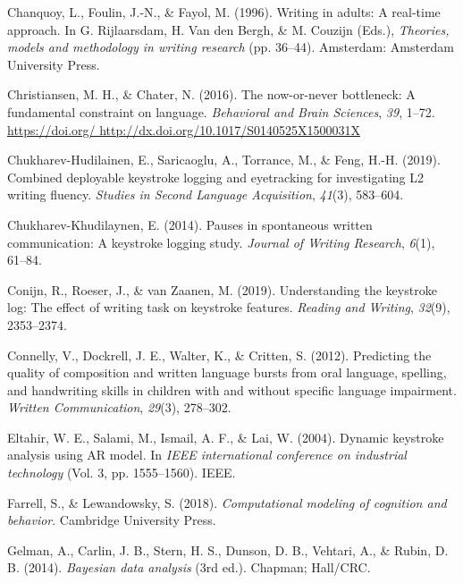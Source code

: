 \documentclass[english,man,floatsintext]{apa7}
\begin{document}
\leavevmode\hypertarget{ref-chanquoy1996writing}{}%
Chanquoy, L., Foulin, J.-N., \& Fayol, M. (1996). Writing in adults: A real-time approach. In G. Rijlaarsdam, H. Van den Bergh, \& M. Couzijn (Eds.), \emph{Theories, models and methodology in writing research} (pp. 36--44). Amsterdam: Amsterdam University Press.

\leavevmode\hypertarget{ref-christiansen2016now}{}%
Christiansen, M. H., \& Chater, N. (2016). The now-or-never bottleneck: A fundamental constraint on language. \emph{Behavioral and Brain Sciences}, \emph{39}, 1--72. \href{https://doi.org/\%20http://dx.doi.org/10.1017/S0140525X1500031X}{https://doi.org/ http://dx.doi.org/10.1017/S0140525X1500031X}

\leavevmode\hypertarget{ref-chukharev2019combined}{}%
Chukharev-Hudilainen, E., Saricaoglu, A., Torrance, M., \& Feng, H.-H. (2019). Combined deployable keystroke logging and eyetracking for investigating L2 writing fluency. \emph{Studies in Second Language Acquisition}, \emph{41}(3), 583--604.

\leavevmode\hypertarget{ref-chukharev2014pauses}{}%
Chukharev-Khudilaynen, E. (2014). Pauses in spontaneous written communication: A keystroke logging study. \emph{Journal of Writing Research}, \emph{6}(1), 61--84.

\leavevmode\hypertarget{ref-conijn2019understanding}{}%
Conijn, R., Roeser, J., \& van Zaanen, M. (2019). Understanding the keystroke log: The effect of writing task on keystroke features. \emph{Reading and Writing}, \emph{32}(9), 2353--2374.

\leavevmode\hypertarget{ref-connelly2012predicting}{}%
Connelly, V., Dockrell, J. E., Walter, K., \& Critten, S. (2012). Predicting the quality of composition and written language bursts from oral language, spelling, and handwriting skills in children with and without specific language impairment. \emph{Written Communication}, \emph{29}(3), 278--302.

\leavevmode\hypertarget{ref-eltahir2004dynamic}{}%
Eltahir, W. E., Salami, M., Ismail, A. F., \& Lai, W. (2004). Dynamic keystroke analysis using AR model. In \emph{IEEE international conference on industrial technology} (Vol. 3, pp. 1555--1560). IEEE.

\leavevmode\hypertarget{ref-farrell2018computational}{}%
Farrell, S., \& Lewandowsky, S. (2018). \emph{Computational modeling of cognition and behavior}. Cambridge University Press.

\leavevmode\hypertarget{ref-gelman2014}{}%
Gelman, A., Carlin, J. B., Stern, H. S., Dunson, D. B., Vehtari, A., \& Rubin, D. B. (2014). \emph{Bayesian data analysis} (3rd ed.). Chapman; Hall/CRC.
\end{document}
